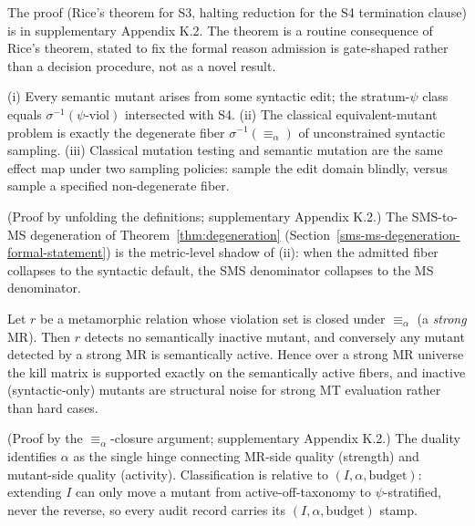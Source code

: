 \documentclass[manuscript,screen,review]{acmart}
\begin{document}
The proof (Rice's theorem for S3, halting reduction for the S4 termination
clause) is in supplementary Appendix K.2. The theorem is a routine consequence
of Rice's theorem, stated to fix the formal reason admission is gate-shaped
rather than a decision procedure, not as a novel result.

\begin{proposition}\label{prop:fiber}
(i) Every semantic mutant arises from some syntactic edit; the
stratum-$\psi$ class equals $\sigma^{-1}(\psi\text{-viol})$ intersected
with S4. (ii) The classical equivalent-mutant problem is exactly the
degenerate fiber $\sigma^{-1}(\equiv_\alpha)$ of unconstrained syntactic
sampling. (iii) Classical mutation testing and semantic mutation are the
same effect map under two sampling policies: sample the edit domain
blindly, versus sample a specified non-degenerate fiber.
\end{proposition}

(Proof by unfolding the definitions; supplementary Appendix K.2.) The
SMS-to-MS degeneration of Theorem~\ref{thm:degeneration}
(Section~\ref{sms-ms-degeneration-formal-statement}) is the metric-level shadow
of (ii): when the admitted fiber collapses to the syntactic default, the SMS
denominator collapses to the MS denominator.

\begin{theorem}\label{thm:duality}
Let $r$ be a
metamorphic relation whose violation set is closed under $\equiv_\alpha$
(a \emph{strong} MR). Then $r$ detects no semantically inactive
mutant, and conversely any mutant detected by a strong MR is
semantically active. Hence over a strong MR universe the kill matrix
is supported exactly on the semantically active fibers, and inactive
(syntactic-only) mutants are structural noise for strong MT evaluation
rather than hard cases.
\end{theorem}

(Proof by the $\equiv_\alpha$-closure argument; supplementary Appendix K.2.)
The duality identifies $\alpha$ as the single hinge connecting MR-side quality
(strength) and mutant-side quality (activity). Classification is relative to
$(I, \alpha, \text{budget})$: extending $I$ can only move a mutant from
active-off-taxonomy to $\psi$-stratified, never the reverse, so every
audit record carries its $(I, \alpha, \text{budget})$ stamp.
\end{document}
